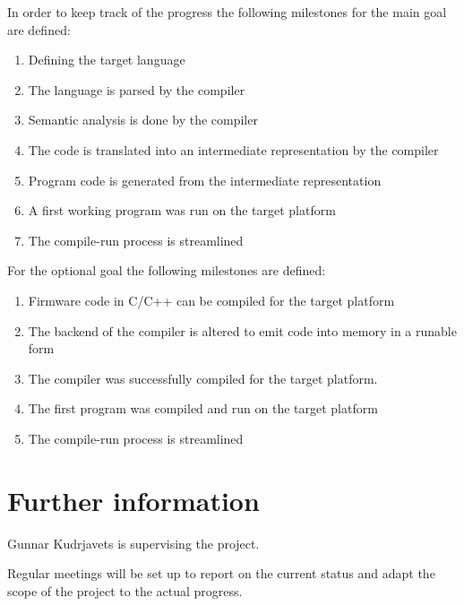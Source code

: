 \documentclass[12pt, a4paper]{article}
\begin{document}
In order to keep track of the progress the following milestones for
the main goal are defined:

\begin{enumerate}
\item Defining the target language
\item The language is parsed by the compiler
\item Semantic analysis is done by the compiler
\item The code is translated into an intermediate representation by
  the compiler
\item Program code is generated from the intermediate representation
\item A first working program was run on the target platform
\item The compile-run process is streamlined
\end{enumerate}

For the optional goal the following milestones are defined:
\begin{enumerate}
\item Firmware code in C/C++ can be compiled for the target platform
\item The backend of the compiler is altered to emit code into memory
  in a runable form
\item The compiler was successfully compiled for the target platform.
\item The first program was compiled and run on the target platform
\item The compile-run process is streamlined
\end{enumerate}

\section{Further information}

Gunnar Kudrjavets is supervising the project.

Regular meetings will be set up to report on the current status and
adapt the scope of the project to the actual progress.
\end{document}
